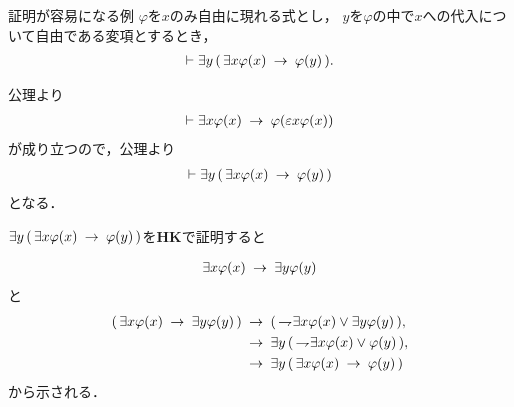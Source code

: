 \newpage
	\begin{itembox}[l]{証明が容易になる例}
		$\varphi$を$x$のみ自由に現れる式とし，
		$y$を$\varphi$の中で$x$への代入について自由である変項とするとき，
		\begin{align}
			\vdash \exists y\, (\, \exists x \varphi(x) \hspace{0.25em}\rightarrow\hspace{0.25em} \varphi(y)\, ).
		\end{align}
	\end{itembox}
	
	\begin{sketch}
		公理より
		\begin{align}
			\vdash \exists x \varphi(x) \hspace{0.25em}\rightarrow\hspace{0.25em} \varphi(\varepsilon x \varphi(x))
		\end{align}
		が成り立つので，公理より
		\begin{align}
			\vdash \exists y\, (\, \exists x \varphi(x) \hspace{0.25em}\rightarrow\hspace{0.25em} \varphi(y)\, )
		\end{align}
		となる．
		\QED
	\end{sketch}

\newpage
	$\exists y\, (\, \exists x \varphi(x) \hspace{0.25em}\rightarrow\hspace{0.25em} \varphi(y)\, )$を{\bf HK}で証明すると
	
	\begin{align}
		\exists x \varphi(x) \hspace{0.25em}\rightarrow\hspace{0.25em} \exists y \varphi(y)
	\end{align}
	と
	\begin{align}
		(\, \exists x \varphi(x) \hspace{0.25em}\rightarrow\hspace{0.25em} \exists y \varphi(y) \, )
		&\hspace{0.25em}\rightarrow\hspace{0.25em} (\, \rightharpoondown\hspace{-0.25em} \exists x \varphi(x) \vee \exists y \varphi(y) \, ), \\
		&\hspace{0.25em}\rightarrow\hspace{0.25em} \exists y\, (\, \rightharpoondown\hspace{-0.25em} \exists x \varphi(x) \vee \varphi(y) \, ), \\
		&\hspace{0.25em}\rightarrow\hspace{0.25em} \exists y\, (\, \exists x \varphi(x) \hspace{0.25em}\rightarrow\hspace{0.25em} \varphi(y) \, )
	\end{align}
	から示される．